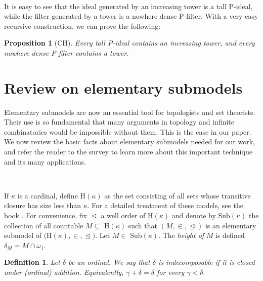 \documentclass{article}%
\newtheorem{definition}[theorem]{Definition}
\newtheorem{proposition}[theorem]{Proposition}
\begin{document}
\qquad\qquad\ \ 

It is easy to see that the ideal generated by an increasing tower is a tall
\textsf{P}-ideal, while the filter generated by a tower is a nowhere dense
\textsf{P}-filter. With a very easy recursive construction, we can prove the following:

\begin{proposition}
[\textsf{CH}]Every tall \textsf{P}-ideal contains an increasing tower, and
every nowhere dense \textsf{P}-filter contains a tower.
\label{CH pideal contiene torre}
\end{proposition}

\section{Review on elementary submodels}

Elementary submodels are now an essential tool for topologists and set
theorists. Their use is so fundamental that many arguments in topology and
infinite combinatorics would be impossible without them. This is the case in
our paper. We now review the basic facts about elementary submodels needed for
our work, and refer the reader to the survey \cite{AlanSubmodelos} to learn
more about this important technique and its many applications.

\qquad\qquad\ \ \ \ \qquad\ \ \ \ \ \ \ \ 

If $\kappa$ is a cardinal, define \textsf{H}$\left(  \kappa\right)  $ as the
set consisting of all sets whose transitive closure has size less than
$\kappa.$ For a detailed treatment of these models, see the book \cite{Kunen}.
For convenience, fix $\trianglelefteq$ a well order of \textsf{H}$\left(
\kappa\right)  $ and denote by \textsf{Sub}$\left(  \kappa\right)  $ the
collection of all countable $M\subseteq$ \textsf{H}$\left(  \kappa\right)  $
such that $\left(  M,\in,\trianglelefteq\right)  $ is an elementary submodel
of $($\textsf{H}$\left(  \kappa\right)  ,\in,\trianglelefteq).$ Let $M\in$
\textsf{Sub}$\left(  \kappa\right)  .$ The \emph{height of }$M$ is defined
$\delta_{M}=M\cap\omega_{1}.$

\begin{definition}
Let $\delta$ be an ordinal. We say that $\delta$ is \emph{indecomposable }if
it is closed under (ordinal) addition. Equivalently, $\gamma+\delta=\delta$
for every $\gamma<\delta.$
\end{definition}

\qquad\qquad\qquad
\end{document}
